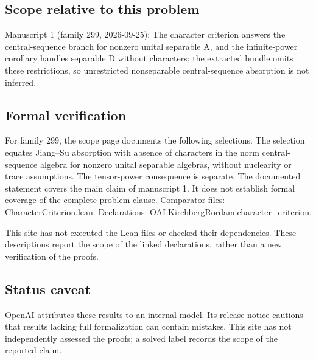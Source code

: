\documentclass[11pt]{article}
\begin{document}
\subsection{Scope relative to this problem}
Manuscript 1 (family 299, 2026-09-25): The character criterion answers the central-sequence branch for nonzero unital separable A, and the infinite-power corollary handles separable D without characters; the extracted bundle omits these restrictions, so unrestricted nonseparable central-sequence absorption is not inferred.

\subsection{Formal verification}
For family 299, the scope page documents the following selections. The selection equates Jiang--Su absorption with absence of characters in the norm central-sequence algebra for nonzero unital separable algebras, without nuclearity or trace assumptions. The tensor-power consequence is separate. The documented statement covers the main claim of manuscript 1. It does not establish formal coverage of the complete problem clause. Comparator files: CharacterCriterion.lean. Declarations: OAI.KirchbergRordam.character\_criterion.

This site has not executed the Lean files or checked their dependencies. These descriptions report the scope of the linked declarations, rather than a new verification of the proofs.

\subsection{Status caveat}
OpenAI attributes these results to an internal model. Its release notice cautions that results lacking full formalization can contain mistakes. This site has not independently assessed the proofs; a solved label records the scope of the reported claim.
\end{document}
